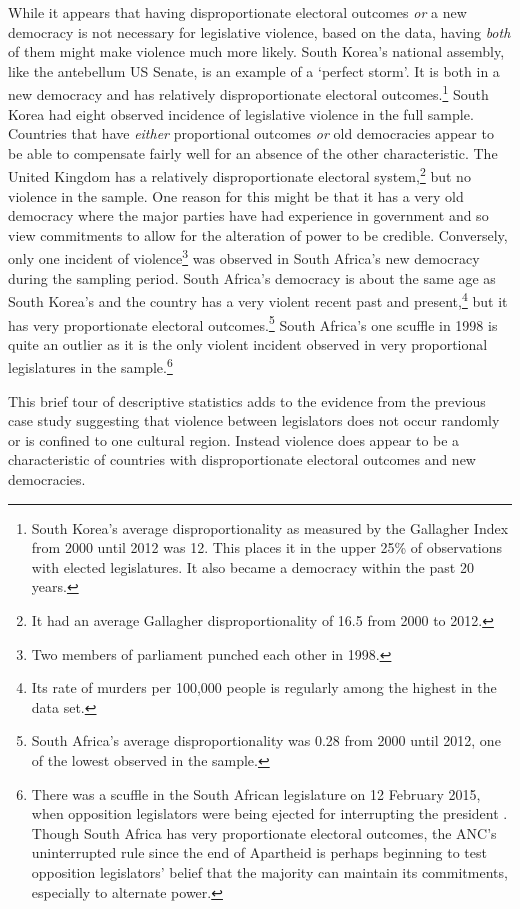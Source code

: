 \documentclass[a4paper]{article}\usepackage[]{graphicx}\usepackage[]{color}
\begin{document}
While it appears that having disproportionate electoral outcomes \emph{or} a new democracy is not necessary for legislative violence, based on the data, having \emph{both} of them might make violence much more likely. South Korea's national assembly, like the antebellum US Senate, is an example of a `perfect storm'. It is both in a new democracy and has relatively disproportionate electoral outcomes.\footnote{South Korea’s average disproportionality as measured by the Gallagher Index \citep{Gallagher1991} from 2000 until 2012 was 12. This places it in the upper 25\% of observations with elected legislatures. It also became a democracy within the past 20 years.} South Korea had eight observed incidence of legislative violence in the full sample. Countries that have \emph{either} proportional outcomes \emph{or} old democracies appear to be able to compensate fairly well for an absence of the other characteristic. The United Kingdom has a relatively disproportionate electoral system,\footnote{It had an average Gallagher disproportionality of 16.5 from 2000 to 2012.} but no violence in the sample. One reason for this might be that it has a very old democracy where the major parties have had experience in government and so view commitments to allow for the alteration of power to be credible. Conversely, only one incident of violence\footnote{Two members of parliament punched each other in 1998.} was observed in South Africa's new democracy during the sampling period. South Africa's democracy is about the same age as South Korea's and the country has a very violent recent past and present,\footnote{Its rate of murders per 100,000 people is regularly among the highest in the \cite{UNMurder2013} data set.} but it has very proportionate electoral outcomes.\footnote{South Africa’s average disproportionality was 0.28 from 2000 until 2012, one of the lowest observed in the sample.} South Africa's one scuffle in 1998 is quite an outlier as it is the only violent incident observed in very proportional legislatures in the sample.\footnote{There was a scuffle in the South African legislature on 12 February 2015, when opposition legislators were being ejected for interrupting the president \citep{Guardian2015}. Though South Africa has very proportionate electoral outcomes, the ANC's uninterrupted rule since the end of Apartheid is perhaps beginning to test opposition legislators' belief that the majority can maintain its commitments, especially to alternate power.}

This brief tour of descriptive statistics adds to the evidence from the previous case study suggesting that violence between legislators does not occur randomly or is confined to one cultural region. Instead violence does appear to be a characteristic of countries with disproportionate electoral outcomes and new democracies.
\end{document}
